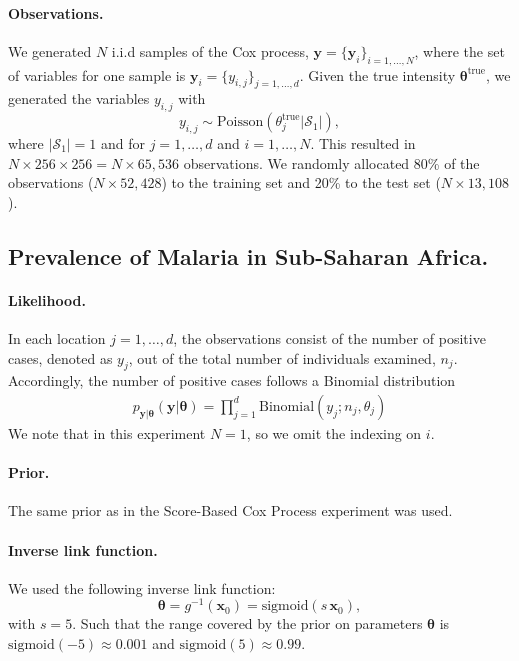 \paragraph{Observations.}
We generated $N$ i.i.d samples of the Cox process, $\mathbf{y} = \{\boldsymbol{y}_i\}_{i=1, \ldots, N}$, where the set of variables for one sample is $\boldsymbol{y}_i = \{y_{i,j}\}_{j=1, \ldots, d}$. Given the true intensity $\boldsymbol{\theta}^{\text{true}}$, we generated the variables $y_{i,j}$ with
\begin{equation*}
    y_{i,j} \sim \text{Poisson}(\theta_j^{\text{true}} |\mathcal{S}_1|),
\end{equation*}
where $|\mathcal{S}_1| = 1$ and for $j = 1, \ldots, d$ and $i = 1, \ldots, N$. This resulted in $N \times 256 \times 256 = N \times 65,536$ observations. We randomly allocated 80\% of the observations ($N \times 52,428$) to the training set and 20\% to the test set ($N \times 13,108$).




\subsection{Prevalence of Malaria in Sub-Saharan Africa.}

\paragraph{Likelihood.} 
In each location $j = 1, \ldots, d$, the observations consist of the number of positive cases, denoted as $y_j$, out of the total number of individuals examined, $n_j$. 
Accordingly, the number of positive cases follows a Binomial distribution
\begin{align*}
p_{\mathbf{y}|\boldsymbol{\theta}}(\mathbf{y}|\boldsymbol{\theta}) = \prod_{j = 1}^d \text{Binomial}(y_j; n_j, \theta_j)
\end{align*}
We note that in this experiment $N =1$, so we omit the indexing on $i$.

\paragraph{Prior.} The same prior as in the Score-Based Cox Process experiment was used.

\paragraph{Inverse link function.}
We used the following inverse link function:
\begin{equation*}
\boldsymbol{\theta} = g^{-1}(\mathbf{x}_0) = \text{sigmoid}(s\, \mathbf{x}_0),
\end{equation*}
with $s=5$. Such that the range covered by the prior on parameters $\boldsymbol{\theta}$ is $\text{sigmoid}(-5) \approx 0.001$ and $\text{sigmoid}(5) \approx 0.99$. 


